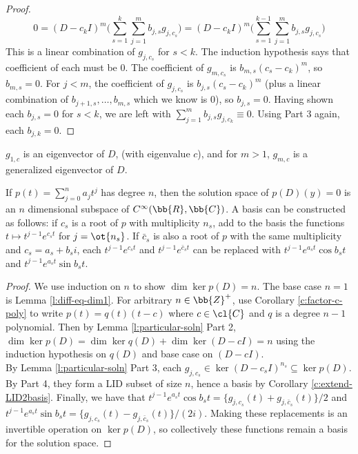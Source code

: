 \begin{proof}
\[ 0=(D-c_kI)^m \big( \sum_{s=1}^k \sum_{j=1}^mb_{j,s}g_{j,c_s}\big)= (D-c_kI)^m \big( \sum_{s=1}^{k-1}\sum_{j=1}^mb_{j,s}g_{j,c_s}\big) \]
This is a linear combination of $g_{j,c_s}$ for $s<k$. The induction hypothesis says that coefficient of each must be 0. The coefficient of $g_{m,c_s}$ is $b_{m,s}(c_s-c_k)^m$, so $b_{m,s}=0$. For $j<m$, the coefficient of $g_{j,c_s}$ is $b_{j,s}(c_s-c_k)^m$ (plus a linear combination of $b_{j+1,s}, \ldots,b_{m,s}$ which we know is 0), so $b_{j,s}=0$.
Having shown each $b_{j,s}=0$ for $s<k$, we are left with $\sum_{j=1}^mb_{j,s}g_{j,c_k}\equiv 0$. Using Part 3 again, each $b_{j,k}=0$.
\end{proof}
\begin{remark}
$g_{1,c}$ is an eigenvector of $D$, (with eigenvalue $c$), and for $m>1$, $g_{m,c}$ is a generalized eigenvector of $D$.
\end{remark}
\begin{prop}
If $p(t)=\sum_{j=0}^na_jt^j$ has degree $n$, then the solution space of $p(D)(y)=0$ is an $n$ dimensional subspace of $C^\infty (\bb{R}, \bb{C})$. A basis can be constructed as follows: if $c_s$ is a root of $p$ with multiplicity $n_s$, add to the basis the functions $t \mapsto t^{j-1}e^{c_st}$ for $j=\ot{n_s}$. If $\bar{c}_s$ is also a root of $p$ with the same multiplicity and $c_s=a_s+b_si$, each $t^{j-1}e^{c_st}$ and $t^{j-1}e^{\bar{c}_st}$ can be replaced with $t^{j-1}e^{a_st}\cos b_st$ and $t^{j-1}e^{a_st}\sin b_st$.
\end{prop}
\begin{proof}%
We use induction on $n$ to show $\dim \ker p(D)=n$. The base case $n=1$ is Lemma \ref{l:diff-eq-dim1}. For arbitrary $n \in \bb{Z}^+$, use Corollary \ref{c:factor-c-poly} to write $p(t)=q(t)(t-c)$ where $c \in \cl{C}$ and $q$ is a degree $n-1$ polynomial. Then by Lemma \ref{l:particular-soln} Part 2, $\dim \ker p(D)= \dim \ker q(D)+ \dim \ker (D-cI)=n$ using the induction hypothesis on $q(D)$ and base case on $(D-cI)$.\\
By Lemma \ref{l:particular-soln} Part 3, each $g_{j,c_s}\in \ker (D-c_sI)^{n_s}\subseteq \ker p(D)$. By Part 4, they form a LID subset of size $n$, hence a basis by Corollary \ref{c:extend-LID2basis}. Finally, we have that $t^{j-1}e^{a_st}\cos b_st=\{ g_{j,c_s}(t)+g_{j,\bar{c}_s}(t)\}/2$ and $t^{j-1}e^{a_st}\sin b_st=\{ g_{j,c_s}(t)-g_{j,\bar{c}_s}(t)\}/(2i)$. Making these replacements is an invertible operation on $\ker p(D)$, so collectively these functions remain a basis for the solution space.
\end{proof}
